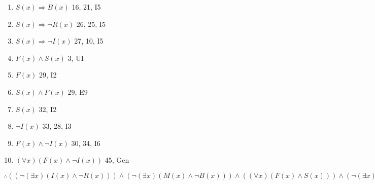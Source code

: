 \documentclass{article}
\begin{document}
\begin{enumerate}
			\item $S(x) \Rightarrow B(x)$ \hfill 16, 21, I5
			\item $S(x) \Rightarrow \lnot R(x)$ \hfill 26, 25, I5
			\item $S(x) \Rightarrow \lnot I(x)$ \hfill 27, 10, I5
			\item $F(x) \land S(x)$ \hfill 3, UI
			\item $F(x)$ \hfill 29, I2
			\item $S(x) \land F(x)$ \hfill 29, E9
			\item $S(x)$ \hfill 32, I2
			\item $\lnot I(x)$ \hfill 33, 28, I3
			\item $F(x) \land \lnot I(x)$ \hfill 30, 34, I6
			\item $(\forall x)(F(x) \land \lnot I(x))$ \hfill 45, Gen
		\end{enumerate}
			$\therefore ((\lnot(\exists x)(I(x) \land \lnot R(x))) \land (\lnot(\exists x)(M(x) \land \lnot B(x))) \land ((\forall x)(F(x) \land S(x))) \land (\lnot(\exists x)(\lnot M(x) \land S(x)))) \Rightarrow ((\forall x)(F(x) \land \lnot I(x)))$ \\
\end{document}
